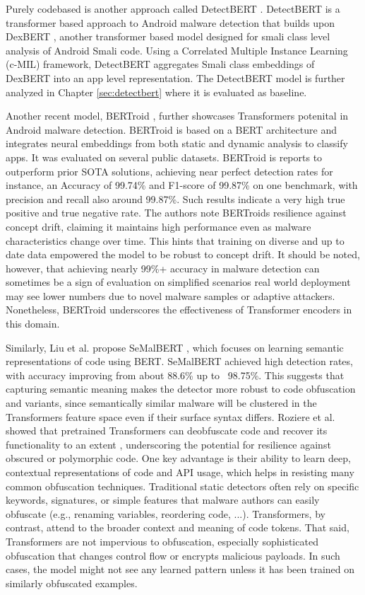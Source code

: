 Purely codebased is another approach called DetectBERT \cite{detectbert}.
DetectBERT is a transformer based approach to Android malware detection that 
builds upon DexBERT \cite{dexbert}, 
another transformer based model designed for smali class level analysis of Android Smali code.
Using a Correlated Multiple Instance Learning (c-MIL) framework, 
DetectBERT aggregates Smali class embeddings of DexBERT into an app level representation.
The DetectBERT model is further analyzed in Chapter \ref{sec:detectbert} where it is evaluated as baseline.

Another recent model, BERTroid 
\cite{bertroid}
, further showcases Transformers potenital in Android malware detection. 
BERTroid is based on a BERT architecture and integrates neural embeddings from both static and dynamic 
analysis to classify apps. 
It was evaluated on several public datasets. 
BERTroid is reports to outperform prior SOTA solutions, achieving near perfect detection rates 
for instance, an Accuracy of 99.74\% and F1-score of 99.87\% on one benchmark, 
with precision and recall also around 99.87\%. 
Such results indicate a very high true positive and true negative rate. 
The authors note BERTroids resilience against concept drift, 
claiming it maintains high performance even as malware characteristics change over time. 
This hints that training on diverse and up to date data empowered the model to be robust to concept drift. 
It should be noted, however, that achieving nearly 99\%+ 
accuracy in malware detection can sometimes be a sign of evaluation on simplified scenarios 
real world deployment may see lower numbers due to novel malware samples or adaptive attackers. 
Nonetheless, BERTroid underscores the effectiveness of Transformer encoders in this domain. 

Similarly, Liu et al. propose SeMalBERT 
\cite{semalbert}
, which focuses on learning semantic representations of code using BERT. 
SeMalBERT achieved high detection rates, with accuracy improving from about 88.6\% up to ~98.75\%. 
This suggests that capturing semantic meaning makes the detector more robust to code obfuscation 
and variants, since semantically similar malware will be clustered in the Transformers feature space 
even if their surface syntax differs. 
Roziere et al. showed that pretrained Transformers can deobfuscate code and 
recover its functionality to an extent 
\cite{deobfuscation}
, underscoring the potential for resilience against obscured or polymorphic code. 
One key advantage is their ability to learn deep, contextual representations of code and API usage, 
which helps in resisting many common obfuscation techniques. 
Traditional static detectors often rely on specific keywords, signatures, or simple features that 
malware authors can easily obfuscate (e.g., renaming variables, reordering code, ...).
Transformers, by contrast, attend to the broader context and meaning of code tokens.
That said, Transformers are not impervious to obfuscation, especially sophisticated obfuscation that 
changes control flow or encrypts malicious payloads. 
In such cases, the model might not see any learned pattern unless it has been trained on 
similarly obfuscated examples. 

